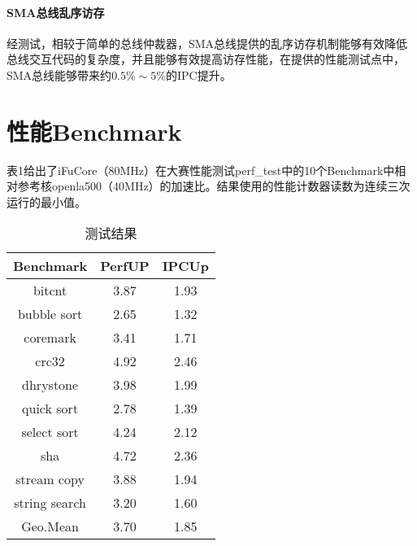 \documentclass{article}
\begin{document}
\paragraph{SMA总线乱序访存} 
经测试，相较于简单的总线仲裁器，SMA总线提供的乱序访存机制能够有效降低总线交互代码的复杂度，并且能够有效提高访存性能，在提供的性能测试点中，SMA总线能够带来约$0.5\% \sim 5\%$的IPC提升。\par

\newpage
\section{性能Benchmark}
表1给出了iFuCore（80MHz）在大赛性能测试perf\_test中的10个Benchmark中相对参考核openla500（40MHz）的加速比。结果使用的性能计数器读数为连续三次运行的最小值。
\begin{table}[h]
    \begin{center}
        \caption{测试结果}
        \begin{tabular}{c|cc}
            Benchmark & PerfUP & IPCUp \\
            \hline
            bitcnt & 3.87 & 1.93 \\
            bubble sort & 2.65 & 1.32 \\
            coremark & 3.41 & 1.71 \\
            crc32 & 4.92 & 2.46 \\
            dhrystone & 3.98 & 1.99 \\
            quick sort & 2.78 & 1.39 \\
            select sort & 4.24 & 2.12 \\
            sha & 4.72 & 2.36 \\
            stream copy & 3.88 & 1.94 \\
            string search & 3.20 & 1.60 \\
            \hline
            Geo.Mean & 3.70 & 1.85 \\
        \end{tabular}
    \end{center}
\end{table}
\end{document}
